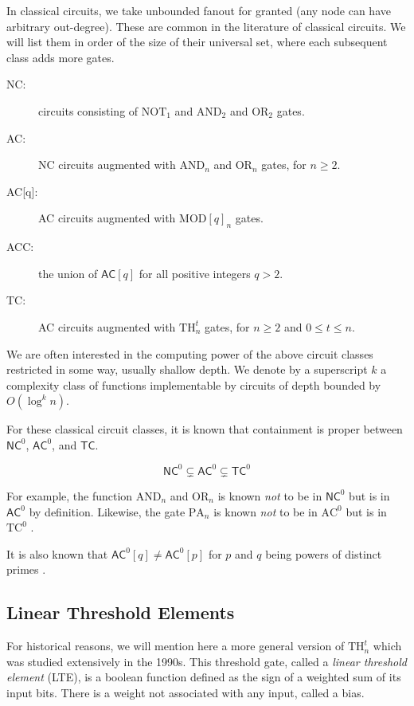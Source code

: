 In classical circuits, we take unbounded fanout
for granted (any node can have arbitrary out-degree). These are common
in the literature of classical circuits. We will list them in order
of the size of their universal set, where each subsequent class adds
more gates.

\begin{description}
\item[\textsf{NC}:]
circuits consisting of $\text{NOT}_1$ and $\text{AND}_2$ and
$\text{OR}_2$ gates.
\item[\textsf{AC}:]
\textsf{NC} circuits augmented with $\text{AND}_n$ and $\text{OR}_n$ gates,
for $n \ge 2$.
\item[\textsf{AC[q]}:] \textsf{AC} circuits augmented with $\text{MOD}[q]_n$ gates.
\item[\textsf{ACC}:] the union of $\textsf{AC}[q]$ for all positive integers $q > 2$.
\item[\textsf{TC}:]
\textsf{AC} circuits augmented with $\text{TH}_n^t$ gates, for $n \ge 2$ and
$0 \le t \le n$.
\end{description}

We are often interested in the computing power of the above
circuit classes restricted in some way, usually shallow depth.
We denote by a superscript $k$ a complexity class of
functions implementable by circuits of depth bounded by $O(\log^k n)$.

For these classical circuit classes, it is known that containment
is proper between $\textsf{NC}^0$, $\textsf{AC}^0$, and $\textsf{TC}$.

\begin{equation}
\textsf{NC}^0 \subsetneq \textsf{AC}^0 \subsetneq \textsf{TC}^0
\end{equation}

For example, the function $\text{AND}_n$ and $\text{OR}_n$ is known
\emph{not} to be in $\textsf{NC}^0$ but is in $\textsf{AC}^0$ by
definition. Likewise, the gate $\text{PA}_n$ is
known \emph{not} to be in $\text{AC}^0$ but is in 
$\text{TC}^0$ \cite{Bruck1990}.

It is also known that $\textsf{AC}^0[q] \ne \textsf{AC}^0[p]$
for $p$ and $q$ being powers of distinct primes \cite{Smolensky1987}.

\subsection{Linear Threshold Elements}

For historical reasons, we will mention here a more general
version of $\text{TH}^t_n$ which was studied extensively in
the 1990s. This threshold gate, 
called a \emph{linear threshold element} (LTE), is a boolean
function defined as
the sign of a weighted sum of its input bits. There is a weight
not associated with any input, called a bias.

